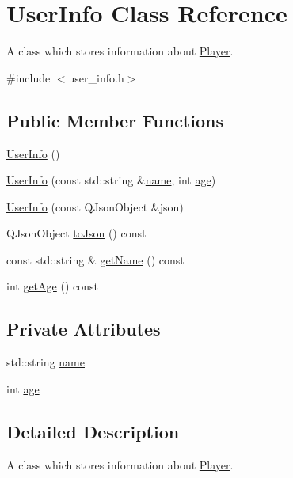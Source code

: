 \hypertarget{classUserInfo}{}\section{User\+Info Class Reference}
\label{classUserInfo}


A class which stores information about \hyperlink{classPlayer}{Player}.  




{\ttfamily \#include $<$user\+\_\+info.\+h$>$}

\subsection*{Public Member Functions}
\begin{DoxyCompactItemize}
\item 
\hyperlink{classUserInfo_a0ab18d3220b81916910df7a18f0c0236}{User\+Info} ()
\item 
\hyperlink{classUserInfo_a3c2608d1eafa1c8c459fb7cc6000afd0}{User\+Info} (const std\+::string \&\hyperlink{classUserInfo_a9b45b3e13bd9167aab02e17e08916231}{name}, int \hyperlink{classUserInfo_a91d98a856bbd96810b40af3ca5cc901a}{age})
\item 
\hyperlink{classUserInfo_ad304963be4e387d8b3bf289190a88010}{User\+Info} (const Q\+Json\+Object \&json)
\item 
Q\+Json\+Object \hyperlink{classUserInfo_a8cfaec036a21fc723e9cf94382891fa0}{to\+Json} () const 
\item 
const std\+::string \& \hyperlink{classUserInfo_aef436e6e20d1dbf2eb78b089ca9d0794}{get\+Name} () const 
\item 
int \hyperlink{classUserInfo_a3c04e615a5a30208ea6140e58c53709e}{get\+Age} () const 
\end{DoxyCompactItemize}
\subsection*{Private Attributes}
\begin{DoxyCompactItemize}
\item 
std\+::string \hyperlink{classUserInfo_a9b45b3e13bd9167aab02e17e08916231}{name}
\item 
int \hyperlink{classUserInfo_a91d98a856bbd96810b40af3ca5cc901a}{age}
\end{DoxyCompactItemize}


\subsection{Detailed Description}
A class which stores information about \hyperlink{classPlayer}{Player}. 

